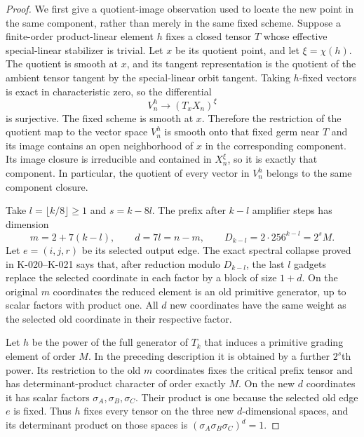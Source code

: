 \begin{proof}
We first give a quotient-image observation used to locate the
new point in the same component, rather than merely in the
same fixed scheme.  Suppose a finite-order product-linear
element $h$ fixes a closed tensor $T$ whose effective
special-linear stabilizer is trivial.  Let $x$ be its quotient
point, and let $\xi=\chi(h)$.  The quotient is smooth at $x$,
and its tangent representation is the quotient of the ambient
tensor tangent by the special-linear orbit tangent.  Taking
$h$-fixed vectors is exact in characteristic zero, so the
differential
\[
                         V_n^h\longrightarrow (T_xX_n)^\xi
                                                        \tag{K-029a}
\]
is surjective.  The fixed scheme is smooth at $x$.  Therefore
the restriction of the quotient map to the vector space $V_n^h$
is smooth onto that fixed germ near $T$ and its image contains
an open neighborhood of $x$ in the corresponding component.
Its image closure is irreducible and contained in $X_n^\xi$,
so it is exactly that component.  In particular, the quotient
of every vector in $V_n^h$ belongs to the same component closure.

Take $l=\lfloor k/8\rfloor\ge1$ and $s=k-8l$.  The prefix
after $k-l$ amplifier steps has dimension
\[
          m=2+7(k-l),\qquad d=7l=n-m,
 \qquad D_{k-l}=2\cdot256^{k-l}=2^sM.
                                                        \tag{K-029b}
\]
Let $e=(i,j,r)$ be its selected output edge.  The exact spectral
collapse proved in K-020--K-021 says that, after reduction modulo
$D_{k-l}$, the last $l$ gadgets replace the selected coordinate
in each factor by a block of size $1+d$.  On the original
$m$ coordinates the reduced element is an old primitive
generator, up to scalar factors with product one.  All $d$
new coordinates have the same weight as the selected old
coordinate in their respective factor.

Let $h$ be the power of the full generator of $T_k$ that induces
a primitive grading element of order $M$.  In the preceding
description it is obtained by a further $2^s$th power.  Its
restriction to the old $m$ coordinates fixes the critical prefix
tensor and has determinant-product character of order exactly
$M$.  On the new $d$ coordinates it has scalar factors
$\sigma_A,\sigma_B,\sigma_C$.  Their product is one because
the selected old edge $e$ is fixed.  Thus $h$ fixes every tensor
on the three new $d$-dimensional spaces, and its determinant
product on those spaces is
$(\sigma_A\sigma_B\sigma_C)^d=1$.


\end{proof}
